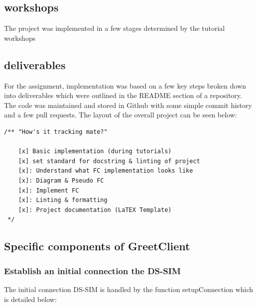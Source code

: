 

\subsection{workshops}The project was implemented in a few stages determined by the tutorial workshops


\subsection{deliverables} For the assignment, implementation was based on a few key steps broken down into deliverables which were outlined in the README section of a repository. The code was maintained and stored in Github with some simple commit history and a few pull requests. The layout of the overall project can be seen below:

\begin{lstlisting}
/** "How's it tracking mate?"

    [x] Basic implementation (during tutorials)
    [x] set standard for docstring & linting of project
    [x]: Understand what FC implementation looks like
    [x]: Diagram & Pseudo FC
    [x]: Implement FC
    [x]: Linting & formatting
    [x]: Project documentation (LaTEX Template)
 */
\end{lstlisting}

\subsection{Specific components of GreetClient}
\subsubsection{Establish an initial connection the DS-SIM}
The initial connection DS-SIM is handled by the function setupConnection which is detailed below:

